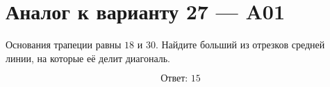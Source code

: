 


\section*{Аналог к варианту 27 — A01}
Основания трапеции равны \(18\) и \(30\). Найдите больший из отрезков средней линии, на которые её делит диагональ.
\begin{center}\figTrapezoidDiagonal\end{center}
\[\boxed{\text{Ответ: }15}\]

